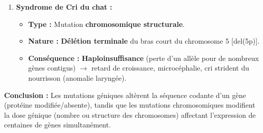 \documentclass[11pt]{article}
\begin{document}
\begin{exoresolu}
\begin{enumerate}
\begin{itemize}
              \end{itemize}
        \item \textbf{Syndrome de Cri du chat :}
              \begin{itemize}
                  \item \textbf{Type :} Mutation \textbf{chromosomique structurale}.
                  \item \textbf{Nature :} \textbf{Délétion terminale} du bras court du chromosome 5 [del(5p)].
                  \item \textbf{Conséquence :} \textbf{Haploinsuffisance} (perte d'un allèle pour de nombreux gènes contigus) $\rightarrow$ retard de croissance, microcéphalie, cri strident du nourrisson (anomalie laryngée).
              \end{itemize}
    \end{enumerate}
    \textbf{Conclusion :} Les mutations géniques altèrent la séquence codante d'un gène (protéine modifiée/absente), tandis que les mutations chromosomiques modifient la dose génique (nombre ou structure des chromosomes) affectant l'expression de centaines de gènes simultanément.
\end{exoresolu}
\end{document}
